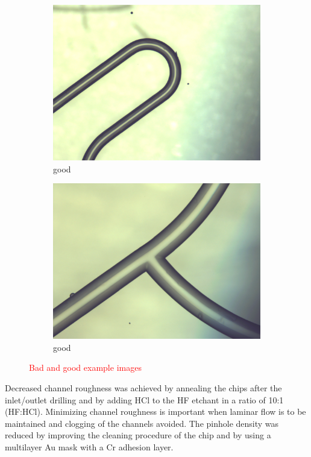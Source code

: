 \documentclass[final]{jyflluk}
\begin{document}
\begin{figure}[!h]
    \begin{subfigure}{0.48\textwidth}
        \centering
        \includegraphics[width=\linewidth]{optical/good1.png} 
        \caption{good} \label{fig:good1}
    \end{subfigure}
    \hfill
    \begin{subfigure}{0.48\textwidth}
        \centering
        \includegraphics[width=\linewidth]{optical/good2.png} 
        \caption{good} \label{fig:good2}
    \end{subfigure}
    \caption{\textcolor{red}{Bad and good example images}} \label{fig:godbad}
\end{figure}  

Decreased channel roughness was achieved by annealing the chips after the inlet/outlet drilling and by adding HCl to the HF etchant in a ratio of 10:1 (HF:HCl). Minimizing channel roughness is important when laminar flow is to be maintained and clogging of the channels avoided. The pinhole density was reduced by improving the cleaning procedure of the chip and by using a multilayer Au mask with a Cr adhesion layer. 
\end{document}
